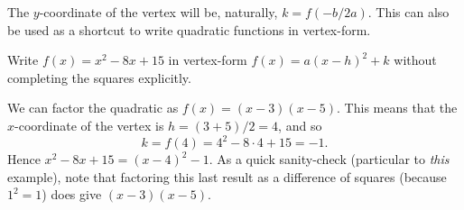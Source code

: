 \documentclass{ximera}
\begin{document}
The $y$-coordinate of the vertex will be, naturally, $k = f(-b/2a)$. This can also be used as a shortcut to write quadratic functions in vertex-form.

\begin{example}
  Write $f(x) = x^2 - 8x+15$ in vertex-form $f(x) = a(x-h)^2+k$ without completing the squares explicitly.\\[.5em]
  \begin{explanation}
    We can factor the quadratic as $f(x) = (x-3)(x-5)$. This means that the $x$-coordinate of the vertex is $h = (3+5)/2 = 4$, and so $$k =f(4) = 4^2-8\cdot 4 + 15 = -1.$$Hence $x^2-8x+15 = (x-4)^2-1$. As a quick sanity-check (particular to \emph{this} example), note that factoring this last result as a difference of squares (because $1^2=1$) does give $(x-3)(x-5)$.
  \end{explanation}
\end{example}
%
%
%
%
%
%
%
\end{document}
